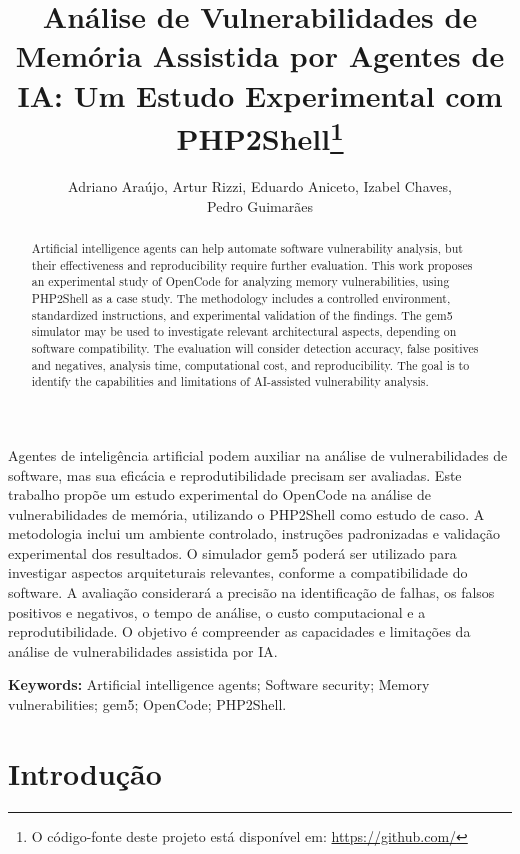 \documentclass[12pt]{article}
\title{Análise de Vulnerabilidades de Memória Assistida por Agentes de IA: Um Estudo Experimental com PHP2Shell\thanks{O código-fonte deste projeto está disponível em:
\url{https://github.com/}}}
\author{Adriano Araújo\inst{1}, Artur Rizzi\inst{1}, Eduardo Aniceto\inst{1}, Izabel Chaves\inst{1}\orcidlink{0009-0008-9198-3909},\\ Pedro Guimarães\inst{1}}
\begin{document}
\maketitle

\begin{abstract}
Artificial intelligence agents can help automate software vulnerability analysis, but their effectiveness and reproducibility require further evaluation. This work proposes an experimental study of OpenCode for analyzing memory vulnerabilities, using PHP2Shell as a case study. The methodology includes a controlled environment, standardized instructions, and experimental validation of the findings. The gem5 simulator may be used to investigate relevant architectural aspects, depending on software compatibility. The evaluation will consider detection accuracy, false positives and negatives, analysis time, computational cost, and reproducibility. The goal is to identify the capabilities and limitations of AI-assisted vulnerability analysis.
\end{abstract}

\begin{resumo}
Agentes de inteligência artificial podem auxiliar na análise de
vulnerabilidades de software, mas sua eficácia e reprodutibilidade
precisam ser avaliadas. Este trabalho propõe um estudo experimental
do OpenCode na análise de vulnerabilidades de memória, utilizando o
PHP2Shell como estudo de caso. A metodologia inclui um ambiente
controlado, instruções padronizadas e validação experimental dos
resultados. O simulador gem5 poderá ser utilizado para investigar
aspectos arquiteturais relevantes, conforme a compatibilidade do
software. A avaliação considerará a precisão na identificação de
falhas, os falsos positivos e negativos, o tempo de análise, o custo computacional e a reprodutibilidade. O objetivo é compreender as capacidades e limitações da análise de vulnerabilidades assistida por IA.
\end{resumo}

\textbf{Keywords:} Artificial intelligence agents; Software security; Memory vulnerabilities; gem5; OpenCode; PHP2Shell.
\section{Introdução}
\end{document}
